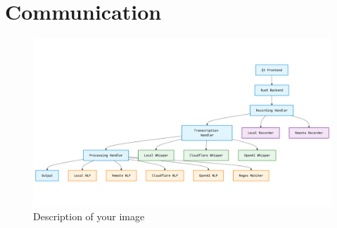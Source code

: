 \renewcommand*\chapterpagestyle{scrheadings}
\chapter{Communication}

\begin{figure}[H]
    \centering
    \includegraphics[width=\textwidth]{assets/stackchart}
    \caption{Description of your image}
    \label{fig:communication}
\end{figure}


